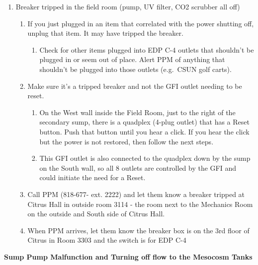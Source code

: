 \documentclass[
]{book}
\providecommand{\tightlist}{%
  \setlength{\itemsep}{0pt}\setlength{\parskip}{0pt}}
\begin{document}
\begin{enumerate}
\def\labelenumi{\arabic{enumi}.}
\tightlist
\item
  Breaker tripped in the field room (pump, UV filter, CO2 scrubber all off)

  \begin{enumerate}
  \def\labelenumii{\arabic{enumii}.}
  \tightlist
  \item
    If you just plugged in an item that correlated with the power shutting off, unplug that item. It may have tripped the breaker.

    \begin{enumerate}
    \def\labelenumiii{\arabic{enumiii}.}
    \tightlist
    \item
      Check for other items plugged into EDP C-4 outlets that shouldn't be plugged in or seem out of place. Alert PPM of anything that shouldn't be plugged into those outlets (e.g.~CSUN golf carts).
    \end{enumerate}
  \item
    Make sure it's a tripped breaker and not the GFI outlet needing to be reset.

    \begin{enumerate}
    \def\labelenumiii{\arabic{enumiii}.}
    \tightlist
    \item
      On the West wall inside the Field Room, just to the right of the secondary sump, there is a quadplex (4-plug outlet) that has a Reset button. Push that button until you hear a click. If you hear the click but the power is not restored, then follow the next steps.
    \item
      This GFI outlet is also connected to the quadplex down by the sump on the South wall, so all 8 outlets are controlled by the GFI and could initiate the need for a Reset.
    \end{enumerate}
  \item
    Call PPM (818-677- ext. 2222) and let them know a breaker tripped at Citrus Hall in outside room 3114 - the room next to the Mechanics Room on the outside and South side of Citrus Hall.
  \item
    When PPM arrives, let them know the breaker box is on the 3rd floor of Citrus in Room 3303 and the switch is for EDP C-4
  \end{enumerate}
\end{enumerate}

\textbf{Sump Pump Malfunction and Turning off flow to the Mesocosm Tanks}
\end{document}
